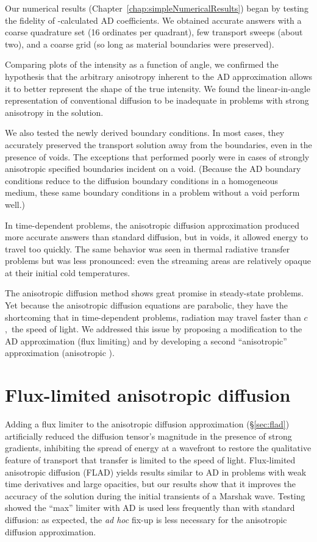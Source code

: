Our numerical results (Chapter~\ref{chap:simpleNumericalResults}) began by
testing the fidelity of \SN-calculated AD coefficients. We obtained accurate
answers with a coarse quadrature set (16 ordinates per quadrant), few
transport sweeps (about two), and a coarse grid (so long as material boundaries
were preserved).

Comparing plots of the intensity as a function of angle, we confirmed the
hypothesis that the arbitrary anisotropy inherent to the AD approximation
allows it to better represent the shape of the true intensity. We found
the linear-in-angle representation of conventional diffusion to be inadequate
in problems with strong anisotropy in the solution.

We also tested the newly derived boundary conditions. In most cases, they
accurately preserved the transport solution away from the boundaries, even in
the presence of voids. The exceptions that performed poorly were in cases of
strongly anisotropic specified boundaries incident on a void. (Because the AD
boundary
conditions reduce to the diffusion boundary conditions in a homogeneous medium,
these same boundary conditions in a problem without a void perform well.)

In time-dependent problems, the anisotropic diffusion approximation produced
more accurate answers than standard diffusion, but in voids, it allowed energy
to travel too quickly. The same behavior was seen in thermal radiative transfer
problems but was less pronounced: even the streaming areas are
relatively opaque at their initial cold temperatures.

The anisotropic diffusion method shows great promise in steady-state problems.
Yet because the anisotropic diffusion equations are parabolic, they have the
shortcoming that in time-dependent problems, radiation may travel faster than
$c$,~the speed of light. We addressed this issue by proposing a modification to
the AD approximation (flux limiting) and by developing a second ``anisotropic''
approximation (anisotropic \Pone).

\section{Flux-limited anisotropic diffusion}

Adding a flux limiter to the anisotropic diffusion approximation
(\S\ref{sec:flad}) artificially reduced the diffusion tensor's magnitude in
the presence of strong gradients, inhibiting the spread of energy at a wavefront
to restore the qualitative feature of transport that transfer is limited to the
speed of light. Flux-limited anisotropic diffusion (FLAD) yields results
similar to AD in problems with weak time derivatives and large opacities, but
our results show that it improves the accuracy of the solution during the
initial transients of a Marshak wave.
Testing showed the ``max'' limiter with AD is used less frequently than with
standard diffusion: as expected, the \emph{ad hoc}
fix-up is less necessary for the anisotropic diffusion approximation.

